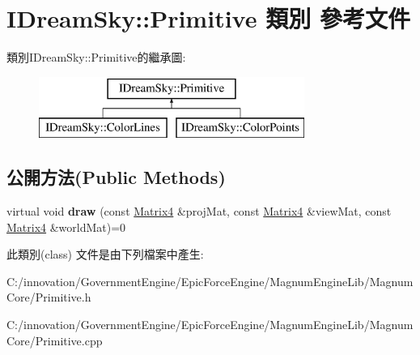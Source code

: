 \hypertarget{class_i_dream_sky_1_1_primitive}{}\section{I\+Dream\+Sky\+:\+:Primitive 類別 參考文件}
\label{class_i_dream_sky_1_1_primitive}
類別\+I\+Dream\+Sky\+:\+:Primitive的繼承圖\+:\begin{figure}[H]
\begin{center}
\leavevmode
\includegraphics[height=2.000000cm]{class_i_dream_sky_1_1_primitive}
\end{center}
\end{figure}
\subsection*{公開方法(Public Methods)}
\begin{DoxyCompactItemize}
\item 
virtual void {\bfseries draw} (const \hyperlink{class_i_dream_sky_1_1_matrix4}{Matrix4} \&proj\+Mat, const \hyperlink{class_i_dream_sky_1_1_matrix4}{Matrix4} \&view\+Mat, const \hyperlink{class_i_dream_sky_1_1_matrix4}{Matrix4} \&world\+Mat)=0\hypertarget{class_i_dream_sky_1_1_primitive_a1bd8efa8835d4e174650d44f47c523e2}{}\label{class_i_dream_sky_1_1_primitive_a1bd8efa8835d4e174650d44f47c523e2}

\end{DoxyCompactItemize}


此類別(class) 文件是由下列檔案中產生\+:\begin{DoxyCompactItemize}
\item 
C\+:/innovation/\+Government\+Engine/\+Epic\+Force\+Engine/\+Magnum\+Engine\+Lib/\+Magnum\+Core/Primitive.\+h\item 
C\+:/innovation/\+Government\+Engine/\+Epic\+Force\+Engine/\+Magnum\+Engine\+Lib/\+Magnum\+Core/Primitive.\+cpp\end{DoxyCompactItemize}
